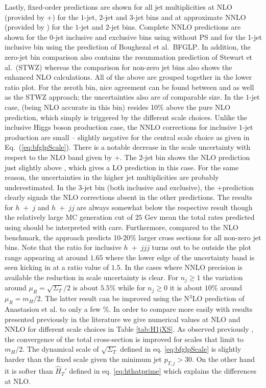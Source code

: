 Lastly, fixed-order predictions are shown for all jet multiplicities
at NLO (provided by \GoSam+\Sherpa) for the $1$-jet, $2$-jet and
$3$-jet bins and at approximate NNLO (provided by \Loopsim) for the
$1$-jet and $2$-jet bins.
Complete NNLO predictions are shown for the 0-jet inclusive and
exclusive bins using \Sherpa without PS and for the 1-jet inclusive
bin using the prediction of Boughezal et al.~\textsc{BFGLP}.
In addition, the zero-jet bin comparison
also contains the resummation prediction of Stewart et
al.~(\textsc{STWZ}) whereas the comparison for non-zero jet bins also
shows the \Minlo enhanced NLO calculations. All of the above are
grouped together in the lower ratio plot. For the zeroth bin, nice
agreement can be found between \Powheg and \Sherpa \NNLOPS as well as
the \textsc{STWZ} approach; the uncertainties also are of comparable
size. In the $1$-jet case, \Powheg (being NLO accurate in this bin)
resides 10\% above the pure NLO prediction, which simply is triggered
by the different scale choices. Unlike the inclusive Higgs boson
production case, the NNLO corrections for inclusive $1$-jet production
are small -- slightly negative for the central scale choice as given
in Eq.~(\ref{eq:bfglpScale}). There is a notable decrease in the scale
uncertainty with respect to the NLO band given by \GoSam+\Sherpa. The $2$-jet bin
shows the \GoSam NLO prediction just slightly above \Powheg, which
gives a LO prediction in this case. For the same reason, the \Powheg
uncertainties in the higher jet multiplicities are probably
underestimated. In the $3$-jet bin (both inclusive and exclusive), the
\GoSam+\Sherpa prediction clearly signals the NLO corrections absent
in the other predictions. The \Loopsim results for $h$~+~$j$ and
$h$~+~$jj$ are always somewhat below the respective \GoSam result
though the relatively large MC generation cut of $25$ Gev mean
the total rates predicted using \Loopsim should be interpreted with care.
Furthermore, compared to the NLO benchmark, the \Minlo approach
predicts 10-20\% larger cross sections for all non-zero jet bins.
Note that the \Minlo ratio for inclusive
$h$~+~$jjj$ turns out to be outside the plot range appearing at around
$1.65$ where the lower edge of the uncertainty band is seen kicking in
at a ratio value of $1.5$. In the cases where NNLO precision is available
the reduction in scale uncertainty is clear. For $n_j\geq1$ the variation around
$\mu_R=\sqrt{\Sigma_T}/2$ is about $5.5\%$ while for $n_j\geq0$ it is about $10\%$
around $\mu_R=m_H/2$. The latter result can be improved using the N${}^3$LO prediction
of Anastasiou et al. \cite{Anastasiou:2015ema} to only a few $\%$. In order to compare more
easily with results presented previously in the literature we give numerical values at NLO and NNLO
for different scale choices in Table \ref{tab:H1jXS}. As observed previously \cite{Boughezal:2015dra},
the convergence of the total cross-section is improved for scales that limit to $m_H/2$. The dynamical scale
of $\sqrt{\Sigma_T}$ defined in eq. \eqref{eq:bfglpScale} is slightly harder than the fixed scale given the
minimum jet $p_{T,j}>30$. On the other hand it is softer than $\hat{H}_T'$ defined in eq. \eqref{eq:hthatprime} which explains
the differences at NLO.

